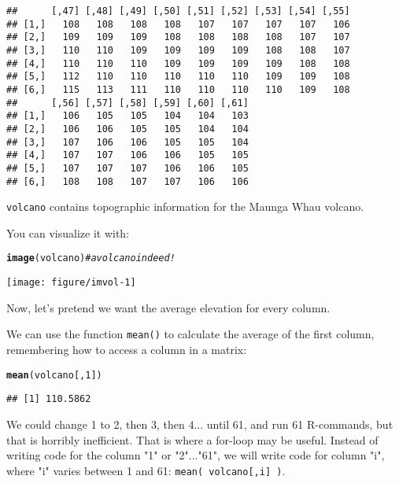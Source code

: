 \documentclass[12pt,a4paper]{scrartcl}\usepackage[]{graphicx}\usepackage[]{color}
\makeatletter
\def\maxwidth{ %
  \ifdim\Gin@nat@width>\linewidth
    \linewidth
  \else
    \Gin@nat@width
  \fi
}
\newcommand{\hlnum}[1]{\textcolor[rgb]{0.686,0.059,0.569}{#1}}%
\newcommand{\hlcom}[1]{\textcolor[rgb]{0.678,0.584,0.686}{\textit{#1}}}%
\newcommand{\hlstd}[1]{\textcolor[rgb]{0.345,0.345,0.345}{#1}}%
\newcommand{\hlkwd}[1]{\textcolor[rgb]{0.737,0.353,0.396}{\textbf{#1}}}%
\newenvironment{kframe}{%
 \def\at@end@of@kframe{}%
 \ifinner\ifhmode%
  \def\at@end@of@kframe{\end{minipage}}%
  \begin{minipage}{\columnwidth}%
 \fi\fi%
 \def\FrameCommand##1{\hskip\@totalleftmargin \hskip-\fboxsep
 \colorbox{shadecolor}{##1}\hskip-\fboxsep
     \hskip-\linewidth \hskip-\@totalleftmargin \hskip\columnwidth}%
 \MakeFramed {\advance\hsize-\width
   \@totalleftmargin\z@ \linewidth\hsize
   \@setminipage}}%
 {\par\unskip\endMakeFramed%
 \at@end@of@kframe}
\newenvironment{knitrout}{}{} %
\makeatother
\begin{document}
\begin{knitrout}
\begin{kframe}
\begin{verbatim}
##      [,47] [,48] [,49] [,50] [,51] [,52] [,53] [,54] [,55]
## [1,]   108   108   108   108   107   107   107   107   106
## [2,]   109   109   109   108   108   108   108   107   107
## [3,]   110   110   109   109   109   109   108   108   107
## [4,]   110   110   110   109   109   109   109   108   108
## [5,]   112   110   110   110   110   110   109   109   108
## [6,]   115   113   111   110   110   110   110   109   108
##      [,56] [,57] [,58] [,59] [,60] [,61]
## [1,]   106   105   105   104   104   103
## [2,]   106   106   105   105   104   104
## [3,]   107   106   106   105   105   104
## [4,]   107   107   106   106   105   105
## [5,]   107   107   107   106   106   105
## [6,]   108   108   107   107   106   106
\end{verbatim}
\end{kframe}
\end{knitrout}

\texttt{volcano} contains topographic information for the Maunga Whau volcano.

You can visualize it with:
\begin{knitrout}
\color{fgcolor}\begin{kframe}
\begin{alltt}
\hlkwd{image}\hlstd{(volcano)} \hlcom{#a volcano indeed!}
\end{alltt}
\end{kframe}
\texttt{[image: figure/imvol-1]} 

\end{knitrout}

Now, let's pretend we want the average elevation for every column.

We can use the function \texttt{mean()} to calculate the average of the first column, remembering how to access a column in a matrix:
\begin{knitrout}
\color{fgcolor}\begin{kframe}
\begin{alltt}
\hlkwd{mean}\hlstd{( volcano[,}\hlnum{1}\hlstd{] )}
\end{alltt}
\begin{verbatim}
## [1] 110.5862
\end{verbatim}
\end{kframe}
\end{knitrout}

We could change 1 to 2, then 3, then 4... until 61, and run 61 R-commands, but that is horribly inefficient. 
That is where a for-loop may be useful. Instead of writing code for the column "1" or "2"..."61",  we will write code for column "i", where "i" varies between 1 and 61: \texttt{mean( volcano[,i] )}.
\end{document}
